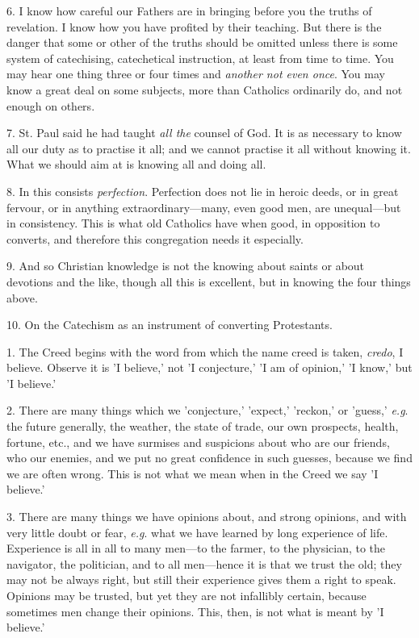 6. I know how careful our Fathers are in bringing
before you the truths of revelation. I know how you have profited by
their teaching. But there is the danger that some or other of the
truths should be omitted unless there is some system of catechising,
catechetical instruction, at least from time to time. You may hear one
thing three or four times and \emph{another not even once}. You may
know a great deal on some subjects, more than Catholics ordinarily do,
and not enough on others.

7. St. Paul said he had taught \emph{all the}
counsel of God. It is as necessary to know all our duty as to practise
it all; and we cannot practise it all without knowing it. What we
should aim at is knowing all and doing all.

8. In this consists \emph{perfection}. Perfection
does not lie in heroic deeds, or in great fervour, or in anything
extraordinary—many, even good men, are unequal—but in consistency.
This is what old Catholics have when good, in opposition to converts,
and therefore this congregation needs it especially.

9. And so Christian knowledge is not the knowing
about saints or about devotions and the like, though all this is
excellent, but in knowing the four things above.

10. On the Catechism as an instrument of con­verting
Protestants.


1. The Creed begins with the word from which the
name creed is taken, \emph{credo}, I believe. Observe it is 'I
believe,' not 'I conjecture,' 'I am of opinion,' 'I know,' but 'I
believe.'

2. There are many things which we 'conjecture,'
'expect,' 'reckon,' or 'guess,' \emph{e.g}. the future generally, the
weather, the state of trade, our own prospects, health, fortune, etc.,
and we have surmises and suspicions about who are our friends, who our
enemies, and we put no great confidence in such guesses, because we
find we are often wrong. This is not what we mean when in the Creed we
say 'I believe.'

3. There are many things we have opinions about,
and strong opinions, and with very little doubt or fear, \emph{e.g}.
what we have learned by long experience of life. Experience is all in
all to many men—to the farmer, to the physician, to the navigator,
the politician, and to all men—hence it is that we trust the old;
they may not be always right, but still their experience gives them a
right to speak. Opinions may be trusted, but yet they are not
infallibly certain, because sometimes men change their opinions. This,
then, is not what is meant by 'I believe.'

